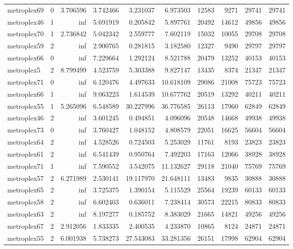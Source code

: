 \begin{longtable}{|l|r|r|r|r|r|r|r|r|r|}
metroplex69 & 0 & 3.706596 & 3.742466 & 3.231037 & 6.973503 & 12583 & 9271 & 29741 & 29741 \\
metroplex46 & 1 & inf & 5.691919 & 0.205842 & 5.897761 & 20492 & 14612 & 49856 & 49856 \\
metroplex70 & 1 & 2.736842 & 5.042342 & 2.559777 & 7.602119 & 15032 & 10055 & 29708 & 29708 \\
metroplex59 & 2 & inf & 2.900765 & 0.281815 & 3.182580 & 12327 & 9490 & 29797 & 29797 \\
metroplex66 & 0 & inf & 7.229664 & 1.292124 & 8.521788 & 20479 & 13252 & 40153 & 40153 \\
metroplex5 & 2 & 8.799499 & 4.523759 & 5.303388 & 9.827147 & 13435 & 8374 & 21347 & 21347 \\
metroplex71 & 0 & inf & 6.120476 & 4.497633 & 10.618109 & 29086 & 21008 & 75723 & 75723 \\
metroplex66 & 1 & inf & 9.063223 & 1.614539 & 10.677762 & 20519 & 13292 & 40211 & 40211 \\
metroplex55 & 1 & 5.265096 & 6.548589 & 30.227996 & 36.776585 & 26113 & 17960 & 62849 & 62849 \\
metroplex46 & 2 & inf & 3.601245 & 0.494851 & 4.096096 & 20548 & 14668 & 49938 & 49938 \\
metroplex73 & 0 & inf & 3.760427 & 1.048152 & 4.808579 & 22051 & 16625 & 56604 & 56604 \\
metroplex64 & 2 & inf & 4.528526 & 0.724503 & 5.253029 & 11761 & 8193 & 23823 & 23823 \\
metroplex61 & 2 & inf & 6.541439 & 0.950764 & 7.492203 & 17163 & 12066 & 38928 & 38928 \\
metroplex71 & 1 & inf & 7.590552 & 3.542075 & 11.132627 & 29118 & 21040 & 75769 & 75769 \\
metroplex57 & 2 & 6.271989 & 2.530141 & 19.117970 & 21.648111 & 13483 & 9835 & 30888 & 30888 \\
metroplex65 & 2 & inf & 3.725375 & 1.390154 & 5.115529 & 25564 & 19239 & 60133 & 60133 \\
metroplex58 & 2 & inf & 6.602403 & 0.636011 & 7.238414 & 30573 & 22215 & 80833 & 80833 \\
metroplex63 & 2 & inf & 8.197277 & 0.185752 & 8.383029 & 21665 & 14821 & 49256 & 49256 \\
metroplex67 & 2 & 2.912056 & 1.833335 & 2.400535 & 4.233870 & 10865 & 8124 & 24871 & 24871 \\
metroplex55 & 2 & 6.001938 & 5.738273 & 27.543083 & 33.281356 & 26151 & 17998 & 62904 & 62904 \\

\end{longtable}
